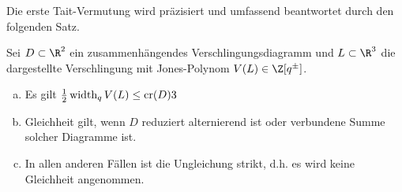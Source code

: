 Die erste Tait-Vermutung wird präzisiert und umfassend beantwortet durch den folgenden Satz.

\begin{st}
    Sei $D \subset \R^2$ ein zusammenhängendes Verschlingungsdiagramm und $L \subset \R^3$ die dargestellte Verschlingung mit Jones-Polynom $V(L) \in \Z[q^\pm]$.
    \begin{enumerate}[a)]
        \item
            Es gilt
            \begin{math}
                \frac{1}{2} \operatorname{width}_q V(L) \le \operatorname{cr}(D)3
            \end{math}
        \item
            Gleichheit gilt, wenn $D$ reduziert alternierend ist oder verbundene Summe solcher Diagramme ist.
        \item
            In allen anderen Fällen ist die Ungleichung strikt, d.h. es wird keine Gleichheit angenommen.
    \end{enumerate}
\end{st}
